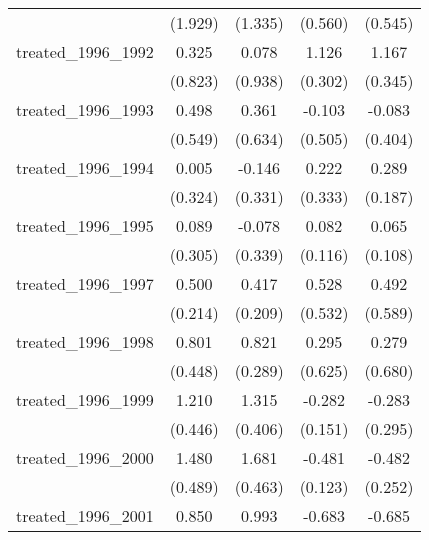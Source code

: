 {\begin{tabular}{l*{4}{c}}
            &     (1.929)         &     (1.335)         &     (0.560)         &     (0.545)         \\
[1em]
treated\_1996\_1992&       0.325         &       0.078         &       1.126\sym{***}&       1.167\sym{***}\\
            &     (0.823)         &     (0.938)         &     (0.302)         &     (0.345)         \\
[1em]
treated\_1996\_1993&       0.498         &       0.361         &      -0.103         &      -0.083         \\
            &     (0.549)         &     (0.634)         &     (0.505)         &     (0.404)         \\
[1em]
treated\_1996\_1994&       0.005         &      -0.146         &       0.222         &       0.289         \\
            &     (0.324)         &     (0.331)         &     (0.333)         &     (0.187)         \\
[1em]
treated\_1996\_1995&       0.089         &      -0.078         &       0.082         &       0.065         \\
            &     (0.305)         &     (0.339)         &     (0.116)         &     (0.108)         \\
[1em]
treated\_1996\_1997&       0.500\sym{*}  &       0.417\sym{*}  &       0.528         &       0.492         \\
            &     (0.214)         &     (0.209)         &     (0.532)         &     (0.589)         \\
[1em]
treated\_1996\_1998&       0.801         &       0.821\sym{**} &       0.295         &       0.279         \\
            &     (0.448)         &     (0.289)         &     (0.625)         &     (0.680)         \\
[1em]
treated\_1996\_1999&       1.210\sym{**} &       1.315\sym{**} &      -0.282         &      -0.283         \\
            &     (0.446)         &     (0.406)         &     (0.151)         &     (0.295)         \\
[1em]
treated\_1996\_2000&       1.480\sym{**} &       1.681\sym{***}&      -0.481\sym{***}&      -0.482         \\
            &     (0.489)         &     (0.463)         &     (0.123)         &     (0.252)         \\
[1em]
treated\_1996\_2001&       0.850         &       0.993\sym{**} &      -0.683\sym{**} &      -0.685\sym{**} \\

\end{tabular}}
